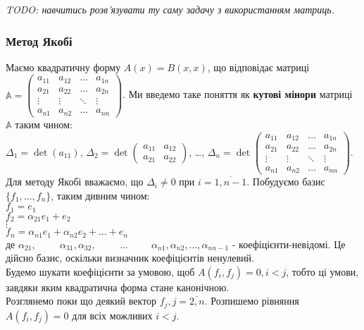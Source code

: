 \documentclass[a4paper, 10pt]{article}
\theoremstyle{theoremdd}
\begin{document}
\textit{TODO: навчитись розв'язувати ту саму задачу з використанням матриць.}

\subsubsection*{Метод Якобі}
Маємо квадратичну форму $A(x) = B(x,x)$, що відповідає матриці $\mathbb{A} = \begin{pmatrix}
a_{11} & a_{12} & \dots & a_{1n} \\
a_{21} & a_{22} & \dots & a_{2n} \\
\vdots & \vdots & \ddots & \vdots \\
a_{n1} & a_{n2} & \dots & a_{nn} 
\end{pmatrix}$. Ми введемо таке поняття як \textbf{кутові мінори} матриці $\mathbb{A}$ таким чином:\\
$\Delta_1 = \det (a_{11})$, $\Delta_2 = \det \begin{pmatrix}
a_{11} & a_{12} \\
a_{21} & a_{22}
\end{pmatrix}$, \dots, $\Delta_n = \det \begin{pmatrix}
a_{11} & a_{12} & \dots & a_{1n} \\
a_{21} & a_{22} & \dots & a_{2n} \\
\vdots & \vdots & \ddots & \vdots \\
a_{n1} & a_{n2} & \dots & a_{nn} 
\end{pmatrix}$.\\
Для методу Якобі вважаємо, що $\Delta_i \neq 0$ при $i = \overline{1,n-1}$. Побудуємо базис $\{f_1,\dots,f_n\}$, таким дивним чином:\\
$f_1 = e_1$\\
$f_2 = \alpha_{21}e_1 + e_2$\\
$\vdots$\\
$f_n = \alpha_{n1}e_1 + \alpha_{n2}e_2 + \dots + e_n$\\
де $\alpha_{21}, \hspace{1cm} \alpha_{31}, \alpha_{32}, \hspace{1cm} \dots \hspace{1cm} \alpha_{n1}, \alpha_{n2}, \dots, \alpha_{nn-1}$ - коефіцієнти-невідомі.
Це дійсно базис, оскільки визначник коефіцієнтів ненулевий.\\
Будемо шукати коефіцієнти за умовою, щоб $A(f_i,f_j) = 0, i < j$, тобто ці умови, завдяки яким квадратична форма стане канонічною.\\
Розглянемо поки що деякий вектор $f_j, j = \overline{2,n}$. Розпишемо рівняння $A(f_i,f_j) = 0$ для всіх можливих $i < j$.\\
\end{document}
